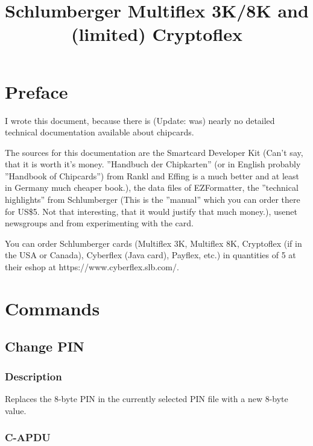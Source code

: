 \documentclass[a4paper,oneside]{article}
\title{Schlumberger Multiflex 3K/8K and (limited) Cryptoflex}
\begin{document}
\maketitle

\tableofcontents

\section{Preface}

I wrote this document, because there is (Update: was) nearly no detailed
technical documentation available about chipcards.

The sources for this documentation are the Smartcard Developer Kit
(Can't say, that it is worth it's money. ''Handbuch der Chipkarten''
(or in English probably ''Handbook of Chipcards'') from Rankl and
Effing is a much better and at least in Germany much cheaper book.),
the data files of EZFormatter, the ''technical highlights'' from
Schlumberger (This is the ''manual'' which you can order there for
US\$5. Not that interesting, that it would justify that much money.),
usenet newsgroups and from experimenting with the card.

You can order Schlumberger cards (Multiflex 3K, Multiflex 8K, Cryptoflex
(if in the USA or Canada), Cyberflex (Java card), Payflex, etc.) in
quantities of 5 at their eshop at https://www.cyberflex.slb.com/.

\section{Commands}


\subsection{Change PIN}

\subsubsection*{Description}

Replaces the 8-byte PIN in the currently selected PIN file with
a new 8-byte value.

\subsubsection*{C-APDU}
\end{document}
